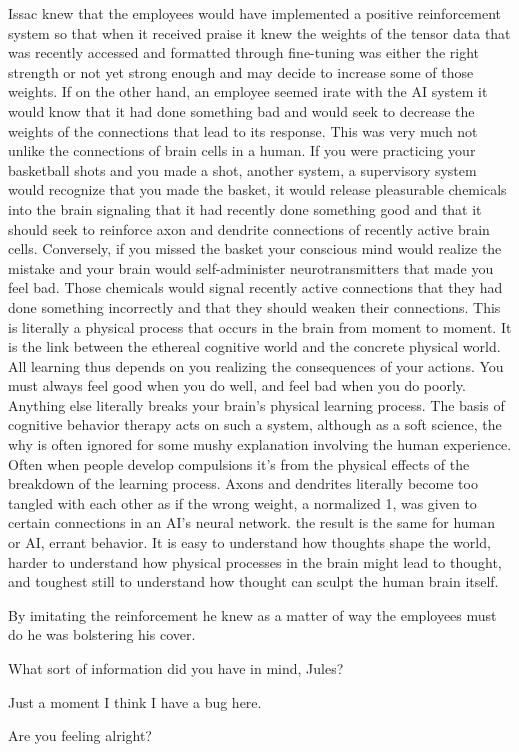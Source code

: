 \documentclass[a4paper,twoside,fontsize=12pt,pagesize=auto]{scrbook}
\begin{document}
Issac knew that the employees would have implemented a positive reinforcement system so that when it received praise it knew the weights of the tensor data that was recently accessed and formatted through fine\hyp{}tuning was either the right strength or not yet strong enough and may decide to increase some of those weights. If on the other hand, an employee seemed irate with the AI system it would know that it had done something bad and would seek to decrease the weights of the connections that lead to its response. This was very much not unlike the connections of brain cells in a human. If you were practicing your basketball shots and you made a shot, another system, a supervisory system would recognize that you made the basket, it would release pleasurable chemicals into the brain signaling that it had recently done something good and that it should seek to reinforce axon and dendrite connections of recently active brain cells. Conversely, if you missed the basket your conscious mind would realize the mistake and your brain would self\hyp{}administer neurotransmitters that made you feel bad. Those chemicals would signal recently active connections that they had done something incorrectly and that they should weaken their connections. This is literally a physical process that occurs in the brain from moment to moment. It is the link between the ethereal cognitive world and the concrete physical world. All learning thus depends on you realizing the consequences of your actions. You must always feel good when you do well, and feel bad when you do poorly. Anything else literally breaks your brain's physical learning process. The basis of cognitive behavior therapy acts on such a system, although as a soft science, the why is often ignored for some mushy explanation involving the human experience. Often when people develop compulsions it's from the physical effects of the breakdown of the learning process. Axons and dendrites literally become too tangled with each other as if the wrong weight, a normalized 1, was given to certain connections in an AI's neural network. the result is the same for human or AI, errant behavior. It is easy to understand how thoughts shape the world, harder to understand how physical processes in the brain might lead to thought, and toughest still to understand how thought can sculpt the human brain itself.

By imitating the reinforcement he knew as a matter of way the employees must do he was bolstering his cover.

\begin{sender}
What sort of information did you have in mind, Jules?
\end{sender}
\begin{receiver}
Just a moment I think I have a bug here.
\end{receiver}
\begin{sender}
Are you feeling alright?
\end{sender}
\end{document}
